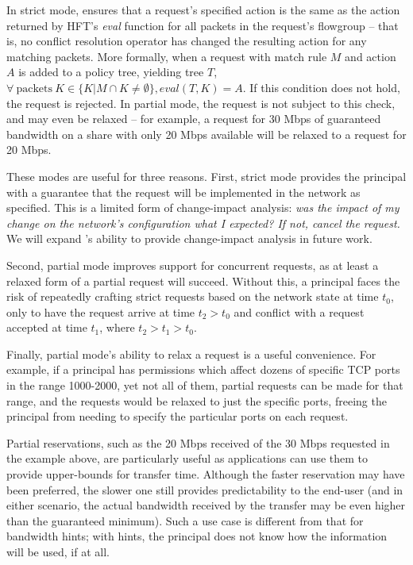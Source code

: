 In strict mode, \sys ensures that a request's specified action
is the same as the action returned by HFT's \emph{eval}
function for all packets in the request's flowgroup -- that is, no
conflict resolution operator has changed the resulting action for
any matching packets.
More formally, when a request with match rule $M$ and action
$A$ is added to a policy tree, yielding tree $T$,
$\forall\ \mathrm{packets}\ K \in \{ K | M \cap K \ne \emptyset \}, \mathit{eval} (T, K) = A$.
If this condition does not hold, the request is rejected.
In partial mode, the request is not subject to this check, and may
even be relaxed -- for example, a request for 30 Mbps of guaranteed
bandwidth on a share with only 20 Mbps available will be relaxed
to a request for 20 Mbps. 

These modes are useful for three reasons. First, strict mode provides
the principal with a guarantee that the request will be implemented
in the network as specified. This is a limited form of change-impact
analysis: \emph{was the impact of my change on the network's configuration
what I expected? If not, cancel the request.} We will expand
\sys's ability to provide change-impact analysis in future work.

Second, partial mode improves support
for concurrent requests, as at least a relaxed form of a partial request will succeed.
Without this, a principal faces the risk of repeatedly crafting
strict requests based on the network state at time $t_0$, only to have
the request arrive at time $t_2 > t_0$ and conflict with a request
accepted at time $t_1$, where $t_2 > t_1 > t_0$.

Finally, partial mode's ability to relax a request is a useful convenience.
For example, if a principal has permissions which affect dozens of
specific TCP ports in the range 1000-2000, yet not all of them, partial
requests can be made for that range, and the requests would be relaxed to
just the specific ports, freeing the principal from needing to specify the
particular ports on each request.

Partial reservations, such as the 20 Mbps received of the 30 Mbps requested
in the example above, are particularly useful as
applications can use them to provide upper-bounds for transfer time. Although the
faster reservation may have been preferred, the slower one still provides
predictability to the end-user (and in either scenario, the actual bandwidth
received by the transfer may be even higher than the guaranteed minimum).
Such a use case is different from that for bandwidth hints; with hints, the
principal does not know how the information will be used, if at all.


